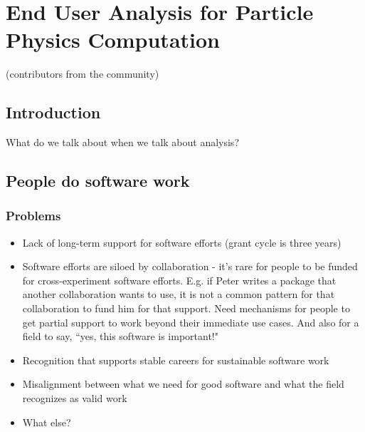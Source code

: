 
\setcounter{chapter}{4} 


\chapter{End User Analysis for Particle Physics Computation}

   {(contributors from the community)}

\section{Introduction}
What do we talk about when we talk about analysis?


\section{People do software work} 

\subsection{Problems}
\begin{itemize}
    \item Lack of long-term support for software efforts (grant cycle is three years)
    \item Software efforts are siloed by collaboration - it's rare for people to be funded for cross-experiment software efforts.  E.g. if Peter writes a package that another collaboration wants to use, it is not a common pattern for that collaboration to fund him for that support.  Need mechanisms for people to get partial support to work beyond their immediate use cases.  And also for a field to say, ``yes, this software is important!"
    \item Recognition that supports stable careers for sustainable software work
    \item Misalignment between what we need for good software and what the field recognizes as valid work
    \item What else?
\end{itemize}



